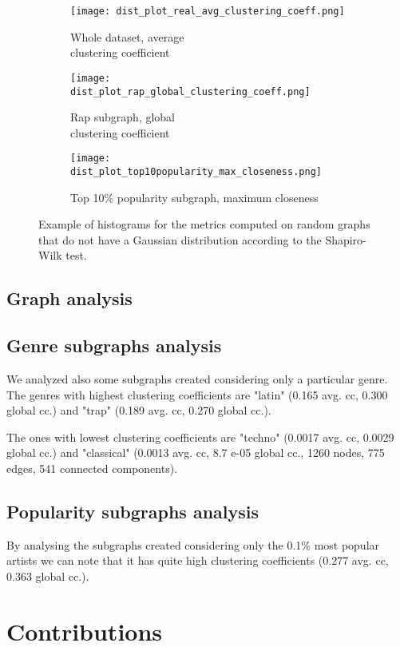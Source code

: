 \documentclass[a4paper, 12pt, conference]{ieeeconf}      %
\begin{document}
  \begin{figure*}
      \centering
      \begin{subfigure}{.33\textwidth}
        \centering
        \captionsetup{justification=centering}
        \texttt{[image: dist\_plot\_real\_avg\_clustering\_coeff.png]}
        \caption{Whole dataset, average \\ clustering coefficient}
        \label{fig:hist1}
      \end{subfigure}%
      \begin{subfigure}{.33\textwidth}
        \centering
        \captionsetup{justification=centering}
        \texttt{[image: dist\_plot\_rap\_global\_clustering\_coeff.png]}
        \caption{Rap subgraph, global \\ clustering coefficient}
        \label{fig:hist2}
      \end{subfigure}
      \begin{subfigure}{.33\textwidth}
        \centering
        \captionsetup{justification=centering}
        \texttt{[image: dist\_plot\_top10popularity\_max\_closeness.png]}
        \caption{Top 10\% popularity subgraph, maximum closeness}
        \label{fig:hist3}
      \end{subfigure}
      \caption{Example of histograms for the metrics computed on random graphs that do not have a Gaussian distribution according to the Shapiro-Wilk test.}
      \label{fig:hist}
  \end{figure*}
  
\subsection{Graph analysis}

\subsection{Genre subgraphs analysis}
We analyzed also some subgraphs created considering only a particular genre.
The genres with highest clustering coefficients are "latin" (0.165 avg. cc,  0.300 global cc.) 
and "trap" (0.189 avg. cc,  0.270 global cc.).

The ones with lowest clustering coefficients are "techno" (0.0017 avg. cc,  0.0029 global cc.)  
and "classical" (0.0013 avg. cc,  8.7 e-05 global cc., 1260 nodes, 775 edges, 541 
connected components).


\subsection{Popularity subgraphs analysis}



By analysing the subgraphs created considering only the 0.1\% most popular artists we can 
note that it has quite high clustering coefficients (0.277 avg. cc,  0.363 global cc.).





\section*{Contributions}

\printbibliography[nottype=online]
\end{document}

